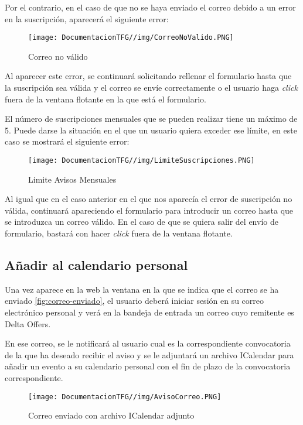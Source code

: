 Por el contrario, en el caso de que no se haya enviado el correo debido a un error en la suscripción, aparecerá el siguiente error: 

\begin{figure}[H]
    \centering
    \texttt{[image: DocumentacionTFG//img/CorreoNoValido.PNG]}
    \caption{Correo no válido}
    \label{fig:correo-no-valido}
\end{figure}

Al aparecer este error, se continuará solicitando rellenar el formulario hasta que la suscripción sea válida y el correo se envíe correctamente o el usuario haga \textit{click} fuera de la ventana flotante en la que está el formulario.

El número de suscripciones mensuales que se pueden realizar tiene un máximo de 5. Puede darse la situación en el que un usuario quiera exceder ese límite, en este caso se mostrará el siguiente error:

\begin{figure}[H]
    \centering
    \texttt{[image: DocumentacionTFG//img/LimiteSuscripciones.PNG]}
    \caption{Limite Avisos Mensuales}
    \label{fig:limite-avisos}
\end{figure}

Al igual que en el caso anterior en el que nos aparecía el error de suscripción no válida, continuará apareciendo el formulario para introducir un correo hasta que se introduzca un correo válido. En el caso de que se quiera salir del envío de formulario, bastará con hacer \textit{click} fuera de la ventana flotante.

\subsection{Añadir al calendario personal}
Una vez aparece en la web la ventana en la que se indica que el correo se ha enviado \ref{fig:correo-enviado}, el usuario deberá iniciar sesión en su correo electrónico personal y verá en la bandeja de entrada un correo cuyo remitente es Delta Offers.

En ese correo, se le notificará al usuario cual es la correspondiente convocatoria de la que ha deseado recibir el aviso y se le adjuntará un archivo ICalendar para añadir un evento a su calendario personal con el fin de plazo de la convocatoria correspondiente.

\begin{figure}[H]
    \centering
    \texttt{[image: DocumentacionTFG//img/AvisoCorreo.PNG]}
    \caption{Correo enviado con archivo ICalendar adjunto}
    \label{fig:enter-label}
\end{figure}

